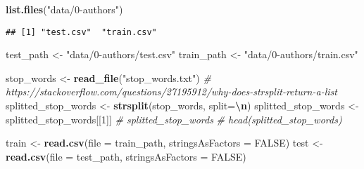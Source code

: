 \documentclass[
]{article}
\newenvironment{Shaded}{\begin{snugshade}}{\end{snugshade}}
\newcommand{\AttributeTok}[1]{\textcolor[rgb]{0.13,0.29,0.53}{#1}}
\newcommand{\CommentTok}[1]{\textcolor[rgb]{0.56,0.35,0.01}{\textit{#1}}}
\newcommand{\ConstantTok}[1]{\textcolor[rgb]{0.56,0.35,0.01}{#1}}
\newcommand{\DecValTok}[1]{\textcolor[rgb]{0.00,0.00,0.81}{#1}}
\newcommand{\FunctionTok}[1]{\textcolor[rgb]{0.13,0.29,0.53}{\textbf{#1}}}
\newcommand{\NormalTok}[1]{#1}
\newcommand{\OtherTok}[1]{\textcolor[rgb]{0.56,0.35,0.01}{#1}}
\newcommand{\SpecialCharTok}[1]{\textcolor[rgb]{0.81,0.36,0.00}{\textbf{#1}}}
\newcommand{\StringTok}[1]{\textcolor[rgb]{0.31,0.60,0.02}{#1}}
\begin{document}
\begin{Shaded}
\begin{Highlighting}[]
\FunctionTok{list.files}\NormalTok{(}\StringTok{"data/0{-}authors"}\NormalTok{)}
\end{Highlighting}
\end{Shaded}

\begin{verbatim}
## [1] "test.csv"  "train.csv"
\end{verbatim}

\begin{Shaded}
\begin{Highlighting}[]
\NormalTok{test\_path }\OtherTok{\textless{}{-}} \StringTok{"data/0{-}authors/test.csv"}
\NormalTok{train\_path }\OtherTok{\textless{}{-}} \StringTok{"data/0{-}authors/train.csv"}

\NormalTok{stop\_words }\OtherTok{\textless{}{-}} \FunctionTok{read\_file}\NormalTok{(}\StringTok{"stop\_words.txt"}\NormalTok{)}
\CommentTok{\# https://stackoverflow.com/questions/27195912/why{-}does{-}strsplit{-}return{-}a{-}list}
\NormalTok{splitted\_stop\_words }\OtherTok{\textless{}{-}} \FunctionTok{strsplit}\NormalTok{(stop\_words, }\AttributeTok{split=}\StringTok{\textquotesingle{}}\SpecialCharTok{\textbackslash{}n}\StringTok{\textquotesingle{}}\NormalTok{)}
\NormalTok{splitted\_stop\_words }\OtherTok{\textless{}{-}}\NormalTok{ splitted\_stop\_words[[}\DecValTok{1}\NormalTok{]]}
\CommentTok{\# splitted\_stop\_words}
\CommentTok{\# head(splitted\_stop\_words)}
\end{Highlighting}
\end{Shaded}

\begin{Shaded}
\begin{Highlighting}[]
\NormalTok{train }\OtherTok{\textless{}{-}}  \FunctionTok{read.csv}\NormalTok{(}\AttributeTok{file =}\NormalTok{ train\_path, }\AttributeTok{stringsAsFactors =} \ConstantTok{FALSE}\NormalTok{)}
\NormalTok{test }\OtherTok{\textless{}{-}}  \FunctionTok{read.csv}\NormalTok{(}\AttributeTok{file =}\NormalTok{ test\_path, }\AttributeTok{stringsAsFactors =} \ConstantTok{FALSE}\NormalTok{)}
\end{Highlighting}
\end{Shaded}
\end{document}
